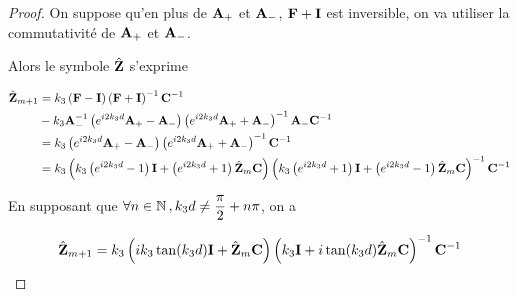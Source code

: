 \begin{proof}
            On suppose qu'en plus de \(\mathbf{A}_+\) et \(\mathbf{A}_-\), \(\mathbf{F} + \mathbf{I}\) est inversible, on va utiliser la commutativité de \(\mathbf{A}_+\) et \(\mathbf{A}_-\).

            Alors le symbole \(\hat {\mathbf{Z}}\) s'exprime

            \begin{align}
                \hat{\mathbf{Z}}_{m+1}
                &=k_3\left(\mathbf{F} - \mathbf{I} \right)\left(\mathbf{F}+ \mathbf{I} \right)^{-1}\mathbf{C}^{-1}
                \\
                &-k_3\mathbf{A}_-^{-1}\left(e^{i2 k_3 d}\mathbf{A}_+ - \mathbf{A}_- \right)\left(e^{i2 k_3 d}\mathbf{A}_+ + \mathbf{A}_- \right)^{-1}\mathbf{A}_-\mathbf{C}^{-1}
                \\
                &=k_3\left( e^{i2 k_3 d} \mathbf{A}_+ -  \mathbf{A}_-\right)
                \left( e^{i2 k_3 d} \mathbf{A}_+ + \mathbf{A}_- \right)^{-1}\mathbf{C}^{-1}
                \\
                &=k_3\left(k_3\left( e^{i2 k_3 d} - 1 \right)\mathbf{I} + \left( e^{i2 k_3 d} + 1 \right) \hat{\mathbf{Z}}_m\mathbf{C} \right)
                \left( k_3\left( e^{i2 k_3 d} + 1 \right)\mathbf{I} + \left( e^{i2 k_3 d} - 1 \right)\hat{\mathbf{Z}}_m\mathbf{C} \right)^{-1}\mathbf{C}^{-1}
            \end{align}

            En supposant que \(\forall n \in \mathbb N \,, k_3d\not = \dfrac{\pi}{2}+n\pi\), on a

            \begin{equation}
                \hat{\mathbf{Z}}_{m+1} = k_3\left(ik_3\tan(k_3 d)\mathbf{I} + \hat{\mathbf{Z}}_m\mathbf{C} \right)
                    \left( k_3\mathbf{I} + i\tan(k_3 d)\hat{\mathbf{Z}}_m\mathbf{C} \right)^{-1}\mathbf{C}^{-1}
            \end{equation}


        \end{proof}


